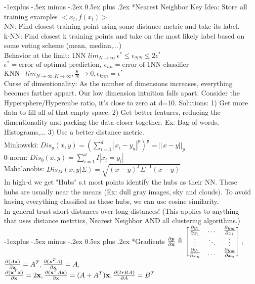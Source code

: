 \documentclass[3pt,landscape]{article}
\makeatletter
\renewcommand{\subsection}{\@startsection{subsection}{2}{0mm}%
                            {-1explus -.5ex minus -.2ex}%
                            {0.5ex plus .2ex}%
                            {\normalfont\normalsize\bfseries}}
\makeatother
\begin{document}
\begin{multicols}{3}

\subsection*{Nearest Neighbor}
Key Idea: Store all training examples $<x_i,f(x_i)>$\\
NN: Find closest training point using some distance metric and take its label.\\
k-NN: Find closest k training points and take on the most likely label based on some voting scheme (mean, median,...)\\
Behavior at the limit: 1NN $lim_{N\to\infty}\ \epsilon^*\le\epsilon_{NN}\le 2\epsilon^*$
$\epsilon^*=\text{error of optimal prediction},\ \epsilon_{nn}=\text{error of 1NN classifier}$\\
KNN \ $lim_{N\to\infty,K\to\infty}, \frac{K}{N}\to 0, \epsilon_{knn}=\epsilon^*$\\
Curse of dimentionality: As the number of dimensions increases, everything becomes farther appart. Our low dimension intuition falls apart. Consider the Hypersphere/Hypercube ratio, it's close to zero at d=10.
Solutions: 1) Get more data to fill all of that empty space. 2) Get better features, reducing the dimentionality and packing the data closer together. Ex: Bag-of-words, Histograms,... 3) Use a better distance metric.\\
Minkowski: $Dis_p(x,y)=(\sum_{i=1}^d|x_i-y_u|^p)^{\frac{1}{p}}=||x-y||_p$\\
0-norm: $Dis_0(x,y)=\sum_{i=1}^d I|x_i=y_i|$\\
Mahalanobis: $Dis_M(x,y|\Sigma)=\sqrt{(x-y)^T\Sigma^{-1}(x-y)}$\\
In high-d we get "Hubs" s.t most points identify the hubs as their NN. These hubs are usually near the means (Ex: dull gray images, sky and clouds). To avoid having everything classified as these hubs, we can use cosine similarity.\\
In general trust short distances over long distances! (This applies to anything that uses distance metrtics, Nearest Neighbor AND all clustering algorithms.)
\subsection*{Gradients}
\(\frac{\partial \bf{y}}{\partial \bf{x}}\triangleq
    \begin{bmatrix}
    \frac{\partial y_1}{\partial x_1} & \dots & \frac{\partial y_m}{\partial x_1} \\
    \vdots & \ddots & \vdots\\
    \frac{\partial y_1}{\partial x_n} & \dots & \frac{\partial y_m}{\partial x_n}
    \end{bmatrix},
\)
\(\frac{\partial (A{\bf x})}{\partial {\bf x}}=A^T, \frac{\partial ({\bf x}^TA)}{\partial {\bf x}}=A,\)\\
\( \frac{\partial ({\bf x}^T{\bf x})}{\partial {\bf x}}=2{\bf x}, \frac{\partial ({\bf x}^TA{\bf x})}{\partial {\bf x}}=(A+A^T){\bf x}, \frac{\partial (trBA)}{\partial A}=B^T\)


\end{multicols}
\end{document}
